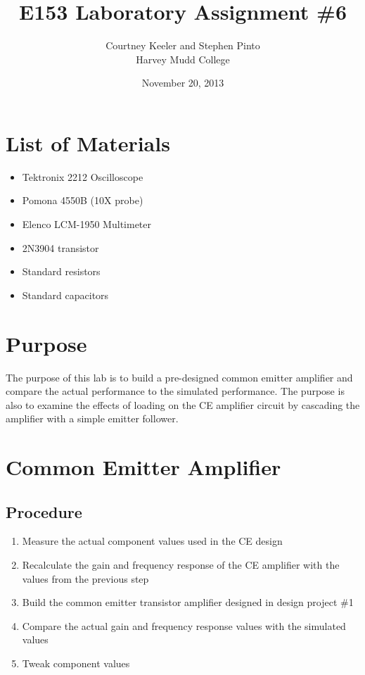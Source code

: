 \documentclass[12pt,letterpaper]{report}
\begin{document}
\title{E153 Laboratory Assignment \#6}
\author{Courtney Keeler and Stephen Pinto\\
Harvey Mudd College}
\date{November 20, 2013}
\maketitle

\section*{List of Materials}
\begin{itemize}
	\item Tektronix 2212 Oscilloscope
	\item Pomona 4550B (10X probe)
	\item Elenco LCM-1950 Multimeter
	\item 2N3904 transistor
	\item Standard resistors
	\item Standard capacitors
\end{itemize}

\section*{Purpose}
The purpose of this lab is to build a pre-designed common emitter amplifier and compare the actual performance to the simulated performance. The purpose is also to examine the effects of loading on the CE amplifier circuit by cascading the amplifier with a simple emitter follower.

\section*{Common Emitter Amplifier}
\subsection*{Procedure}

\begin{enumerate}
\item Measure the actual component values used in the CE design
\item Recalculate the gain and frequency response of the CE amplifier with the values from the previous step
\item Build the common emitter transistor amplifier designed in design project \#1
\item Compare the actual gain and frequency response values with the simulated values
\item Tweak component values 
\end{enumerate}
\end{document}

